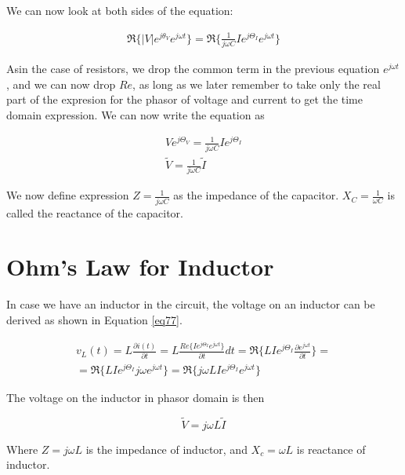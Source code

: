 \documentclass{ximera}
\begin{document}
We can now look at both sides of the equation: 


\begin{eqnarray}
 \Re\{|V|e^{j\theta_{V}} e^{j \omega t}\} =  \Re\{   \frac{1}{j \omega C}  I e^{j \Theta_I}  e^{j \omega t}  \}  \label{eq:CapCurrent1}
\end{eqnarray} 


Asin the case of resistors, we drop  the common term in the previous equation $ e^{j\omega t}$, and we can now drop $Re$, as long as we later remember to take only the real part of the expresion for the phasor of voltage and current to get the time domain expression. We can now
write the equation as




\begin{eqnarray}
 V  e^{j \Theta_{V}}  =   \frac{1}{j \omega C}  I e^{j \Theta_I}  \\
 \tilde{V}  =  \frac{1}{j \omega C}  \tilde{I}
\end{eqnarray}

We now define expression $Z=\frac{1}{j \omega C} $ as the impedance of the capacitor. $X_C=\frac{1}{ \omega C}$ is called the reactance of the capacitor.


\section{Ohm's Law for Inductor}


In case we have an inductor in the circuit, the voltage on an inductor can be derived as shown in Equation \ref{eq77}. 



\begin{eqnarray}
v_L(t) = L \frac{\partial{ i(t)}}{\partial t}  =L  \frac{ Re\{    I e^{j \Theta_I} e^{j \omega t}\}}{\partial t}  dt  = \Re\{  LI e^{j \Theta_I} \frac{ \partial e^{j \omega t}}{\partial t} \} =  \nonumber \\ = \Re\{  LI e^{j  \Theta_I}  j  \omega e^{j \omega t} \} =  \Re \{  j  \omega       LI e^{j  \Theta_I}    e^{j \omega t}   \}      \label{eq77} 
\end{eqnarray}

The voltage on the inductor in phasor domain is then

\begin{equation}
\tilde{V}=j \omega L \tilde{I}
\end{equation}

Where $Z= j \omega L  $ is the impedance of inductor, and $X_c= \omega L $ is reactance of inductor.
\end{document}
